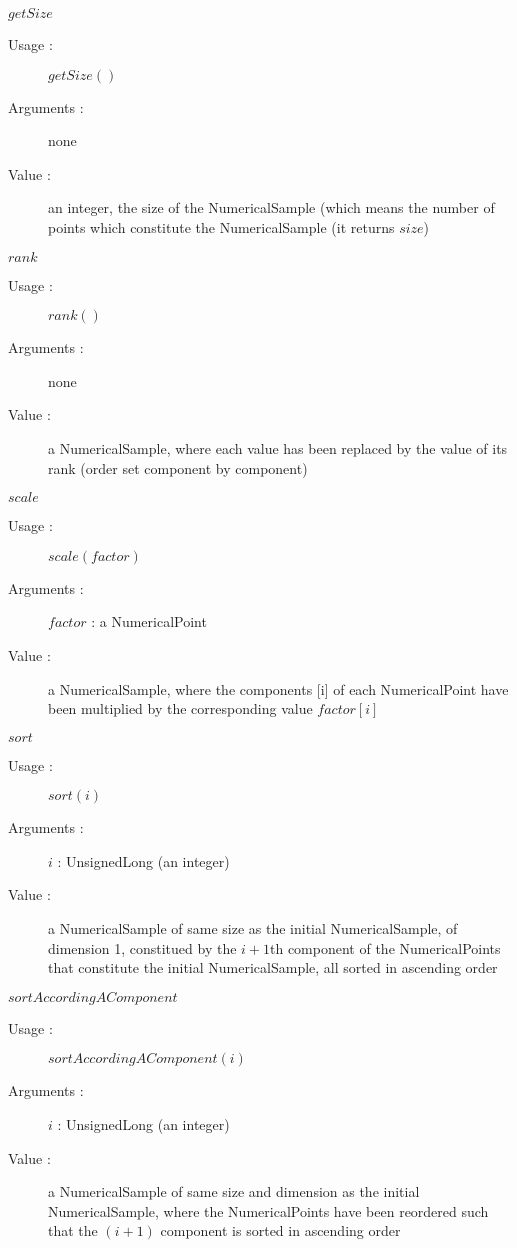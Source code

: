 \begin{description}
\begin{description}
  \item $getSize$
    \begin{description}
    \item[Usage :] $getSize()$
    \item[Arguments :] none
    \item[Value :] an integer, the size of the NumericalSample (which means the number of points which constitute the NumericalSample (it returns $size$)
    \end{description}
    \bigskip

  \item $rank$
    \begin{description}
    \item[Usage :] $rank()$
    \item[Arguments :] none
    \item[Value :] a NumericalSample, where each value has been replaced by the value of its rank (order set component by component)
    \end{description}
    \bigskip

  \item $scale$
    \begin{description}
    \item[Usage :] $scale(factor)$
    \item[Arguments :] $factor$ : a NumericalPoint
    \item[Value :] a NumericalSample, where the components [i] of each NumericalPoint have been multiplied by the corresponding value $factor[i]$
    \end{description}
    \bigskip

  \item $sort$
    \begin{description}
    \item[Usage :] $sort(i)$
    \item[Arguments :] $i$ : UnsignedLong (an integer)
    \item[Value :] a NumericalSample of same size as the initial NumericalSample, of dimension 1, constitued by the $i+1$th component of the NumericalPoints that constitute the initial NumericalSample,  all sorted in ascending order
    \end{description}
    \bigskip

  \item $sortAccordingAComponent$
    \begin{description}
    \item[Usage :] $sortAccordingAComponent(i)$
    \item[Arguments :] $i$ : UnsignedLong (an integer)
    \item[Value :] a NumericalSample of same size and dimension as the initial NumericalSample, where the NumericalPoints have been reordered such that the $(i+1)$ component is sorted in ascending order
    \end{description}
    \bigskip



\end{description}
\end{description}
